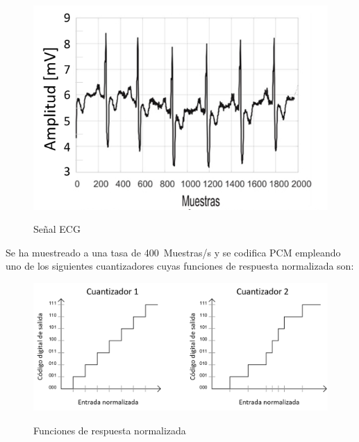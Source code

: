 \begin{enumerate}
\begin{enumerate}
\begin{figure}[h!]
	\captionsetup{justification = raggedright, singlelinecheck = false}
	\caption{Señal ECG} 
	\centering
	\includegraphics[scale=0.7]{Imagenes/senal-ecg.png}
	\label{fig:senal-ecg}
\end{figure}


	Se ha muestreado a una tasa de 400~Muestras/s y se codifica PCM empleando uno de los siguientes cuantizadores cuyas funciones de respuesta normalizada son:
\vspace{200px}
\begin{figure}[h!]
	\captionsetup{justification = raggedright, singlelinecheck = false}
	\caption{Funciones de respuesta normalizada} 
	\centering
	\includegraphics[scale=0.4]{Imagenes/cuantizador.png}
	\label{fig:cuantizador}
\end{figure}




\end{enumerate}
\end{enumerate}
